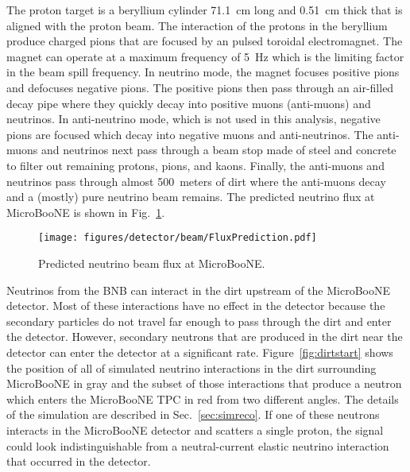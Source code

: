     The proton target is a beryllium cylinder 71.1~cm long and 0.51~cm thick
    that is aligned with the proton beam. The interaction of the protons in the
    beryllium produce charged pions that are focused by an pulsed toroidal
    electromagnet. The magnet can operate at a maximum frequency of 5~Hz which
    is the limiting factor in the beam spill frequency. In neutrino mode, the
    magnet focuses positive pions and defocuses negative pions. The positive
    pions then pass through an air-filled decay pipe where they quickly decay
    into positive muons (anti-muons) and neutrinos. In anti-neutrino mode,
    which is not used in this analysis, negative pions are focused which decay
    into negative muons and anti-neutrinos. The anti-muons and neutrinos next
    pass through a beam stop made of steel and concrete to filter out remaining
    protons, pions, and kaons. Finally, the anti-muons and neutrinos pass
    through almost 500~meters of dirt where the anti-muons decay and a (mostly)
    pure neutrino beam remains. The predicted neutrino flux at MicroBooNE is
    shown in Fig.~\ref{fig:beamflux}.

    \begin{figure}[h]
      \centering
      \texttt{[image: figures/detector/beam/FluxPrediction.pdf]}
      \caption{Predicted neutrino beam flux at MicroBooNE.}
      \label{fig:beamflux}
    \end{figure}

    Neutrinos from the BNB can interact in the dirt upstream of the MicroBooNE
    detector. Most of these interactions have no effect in the detector because
    the secondary particles do not travel far enough to pass through the dirt
    and enter the detector. However, secondary neutrons that are produced in
    the dirt near the detector can enter the detector at a significant rate.
    Figure~\ref{fig:dirtstart} shows the position of all of simulated neutrino
    interactions in the dirt surrounding MicroBooNE in gray and the subset of
    those interactions that produce a neutron which enters the MicroBooNE TPC
    in red from two different angles. The details of the simulation are
    described in Sec.~\ref{sec:simreco}. If one of these neutrons interacts in
    the MicroBooNE detector and scatters a single proton, the signal could look
    indistinguishable from a neutral-current elastic neutrino interaction that
    occurred in the detector.

